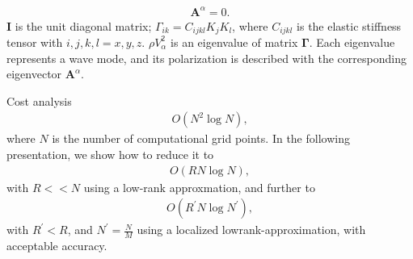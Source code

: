 \documentclass[aspectratio=43]{beamer}
\begin{document}
\begin{frame}
\begin{eqnarray*}
[\boldsymbol{\Gamma}-\rho V_\alpha^2\boldsymbol{I}]\boldsymbol{A}^\alpha=0.
\end{eqnarray*}
$\boldsymbol{I}$ is the unit diagonal matrix; $\Gamma_{ik}=C_{ijkl}K_jK_l$, where $C_{ijkl}$ is the elastic stiffness tensor with $i,j,k,l = x,y,z$. $\rho V_\alpha^2$ is an eigenvalue of matrix $\boldsymbol{\Gamma}$. Each eigenvalue represents a wave mode, and its polarization is described with the corresponding eigenvector $\boldsymbol{A}^\alpha$.

\end{frame}

\begin{frame}{Cost analysis}
\begin{eqnarray*}
O(N^2\log N),
\end{eqnarray*}
where $N$ is the number of computational grid points. In the following presentation, we show how to reduce it to
\begin{eqnarray*}
 O(RN\log N),
\end{eqnarray*}
with $R<<N$ using a low-rank approxmation, and further to 
\begin{eqnarray*}
O(R^\prime N \log N^\prime),
\end{eqnarray*}
with $R^\prime<R$, and $N^\prime=\frac{N}{M}$ using a localized lowrank-approximation, with acceptable accuracy.
\end{frame}
\end{document}
